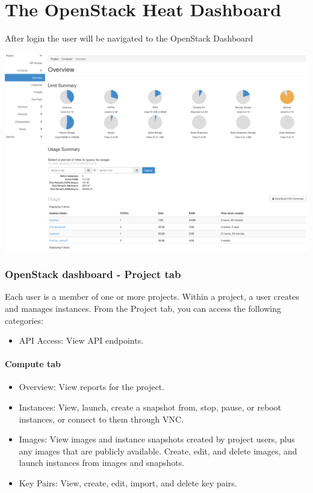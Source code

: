 \chapter{The OpenStack Heat Dashboard}

After login the user will be navigated to the \gls{OpenStack Dashboard}

\begin{center}
\includegraphics[scale=0.3]{img/tab-compute-overview.png}
\end{center}

\subsection{OpenStack dashboard - Project
tab}\label{openstack-dashboard---project-tab}

Each user is a member of one or more projects. Within a project, a user
creates and manages instances. From the Project tab, you can access the
following categories:

\begin{itemize}
\item
  API Access: View API endpoints.
\end{itemize}

\subsubsection{\texorpdfstring{Compute
tab}{Compute tab}}\label{compute-tab}

\begin{itemize}
\item
  Overview: View reports for the project.
\item
  Instances: View, launch, create a snapshot from, stop, pause, or
  reboot instances, or connect to them through VNC.
\item
  Images: View images and instance snapshots created by project users,
  plus any images that are publicly available. Create, edit, and delete
  images, and launch instances from images and snapshots.
\item
  Key Pairs: View, create, edit, import, and delete key pairs.
\end{itemize}

